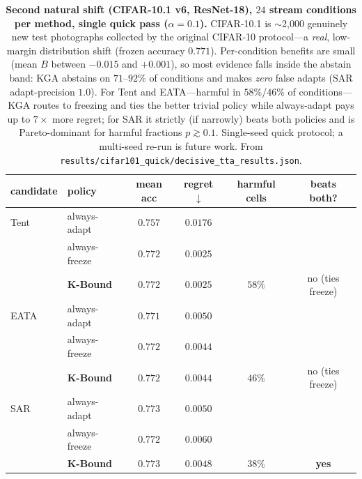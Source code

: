 \documentclass[conference]{IEEEtran}
\theoremstyle{plain}
\theoremstyle{definition}
\begin{document}
\begin{table}[t]\centering\small
\begin{tabular}{llcccc}
\toprule
candidate & policy & mean acc & regret$\downarrow$ & harmful cells & beats both? \\
\midrule
Tent & always-adapt     & $0.757$          & $0.0176$          &        & \\
     & always-freeze    & $\mathbf{0.772}$ & $\mathbf{0.0025}$ &        & \\
     & \textbf{K-Bound} & $\mathbf{0.772}$ & $\mathbf{0.0025}$ & $58\%$ & no (ties freeze) \\
\midrule
EATA & always-adapt     & $0.771$          & $0.0050$          &        & \\
     & always-freeze    & $\mathbf{0.772}$ & $\mathbf{0.0044}$ &        & \\
     & \textbf{K-Bound} & $\mathbf{0.772}$ & $\mathbf{0.0044}$ & $46\%$ & no (ties freeze) \\
\midrule
SAR  & always-adapt     & $0.773$          & $0.0050$          &        & \\
     & always-freeze    & $0.772$          & $0.0060$          &        & \\
     & \textbf{K-Bound} & $\mathbf{0.773}$ & $\mathbf{0.0048}$ & $38\%$ & \textbf{yes} \\
\bottomrule
\end{tabular}
\caption{\textbf{Second natural shift (CIFAR-10.1 v6, ResNet-18), $24$ stream conditions per
method, single quick pass ($\alpha{=}0.1$).} CIFAR-10.1 is $\sim$2{,}000 genuinely new test
photographs collected by the original CIFAR-10 protocol---a \emph{real}, low-margin
distribution shift (frozen accuracy $0.771$). Per-condition benefits are small (mean $B$
between $-0.015$ and $+0.001$), so most evidence falls inside the abstain band:
\textsc{KGA} abstains on $71$--$92\%$ of conditions and makes \emph{zero} false adapts
(SAR adapt-precision $1.0$). For Tent and EATA---harmful in $58\%$/$46\%$ of
conditions---\textsc{KGA} routes to freezing and ties the better trivial policy while
always-adapt pays up to $7\times$ more regret; for SAR it strictly (if narrowly) beats both
policies and is Pareto-dominant for harmful fractions $p\gtrsim0.1$. Single-seed quick
protocol; a multi-seed re-run is future work. From
\texttt{results/cifar101\_quick/decisive\_tta\_results.json}.}
\label{tab:cifar101}
\end{table}
\end{document}
